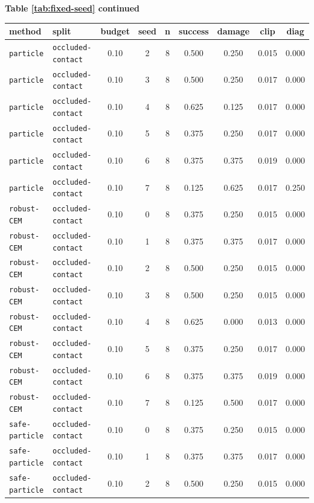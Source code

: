 \documentclass{article}
\begin{document}
\begin{center}
\textbf{Table \ref{tab:fixed-seed} continued}\\[0.4ex]
\begin{tabular}{llccccccc}
\toprule
method & split & budget & seed & n & success & damage & clip & diag \\
\midrule
\texttt{particle} & \texttt{occluded-contact} & 0.10 & 2 & 8 & 0.500 & 0.250 & 0.015 & 0.000 \\
\texttt{particle} & \texttt{occluded-contact} & 0.10 & 3 & 8 & 0.500 & 0.250 & 0.017 & 0.000 \\
\texttt{particle} & \texttt{occluded-contact} & 0.10 & 4 & 8 & 0.625 & 0.125 & 0.017 & 0.000 \\
\texttt{particle} & \texttt{occluded-contact} & 0.10 & 5 & 8 & 0.375 & 0.250 & 0.017 & 0.000 \\
\texttt{particle} & \texttt{occluded-contact} & 0.10 & 6 & 8 & 0.375 & 0.375 & 0.019 & 0.000 \\
\texttt{particle} & \texttt{occluded-contact} & 0.10 & 7 & 8 & 0.125 & 0.625 & 0.017 & 0.250 \\
\texttt{robust-CEM} & \texttt{occluded-contact} & 0.10 & 0 & 8 & 0.375 & 0.250 & 0.015 & 0.000 \\
\texttt{robust-CEM} & \texttt{occluded-contact} & 0.10 & 1 & 8 & 0.375 & 0.375 & 0.017 & 0.000 \\
\texttt{robust-CEM} & \texttt{occluded-contact} & 0.10 & 2 & 8 & 0.500 & 0.250 & 0.015 & 0.000 \\
\texttt{robust-CEM} & \texttt{occluded-contact} & 0.10 & 3 & 8 & 0.500 & 0.250 & 0.015 & 0.000 \\
\texttt{robust-CEM} & \texttt{occluded-contact} & 0.10 & 4 & 8 & 0.625 & 0.000 & 0.013 & 0.000 \\
\texttt{robust-CEM} & \texttt{occluded-contact} & 0.10 & 5 & 8 & 0.375 & 0.250 & 0.017 & 0.000 \\
\texttt{robust-CEM} & \texttt{occluded-contact} & 0.10 & 6 & 8 & 0.375 & 0.375 & 0.019 & 0.000 \\
\texttt{robust-CEM} & \texttt{occluded-contact} & 0.10 & 7 & 8 & 0.125 & 0.500 & 0.017 & 0.000 \\
\texttt{safe-particle} & \texttt{occluded-contact} & 0.10 & 0 & 8 & 0.375 & 0.250 & 0.015 & 0.000 \\
\texttt{safe-particle} & \texttt{occluded-contact} & 0.10 & 1 & 8 & 0.375 & 0.375 & 0.017 & 0.000 \\
\texttt{safe-particle} & \texttt{occluded-contact} & 0.10 & 2 & 8 & 0.500 & 0.250 & 0.015 & 0.000 \\

\end{tabular}
\end{center}
\end{document}
